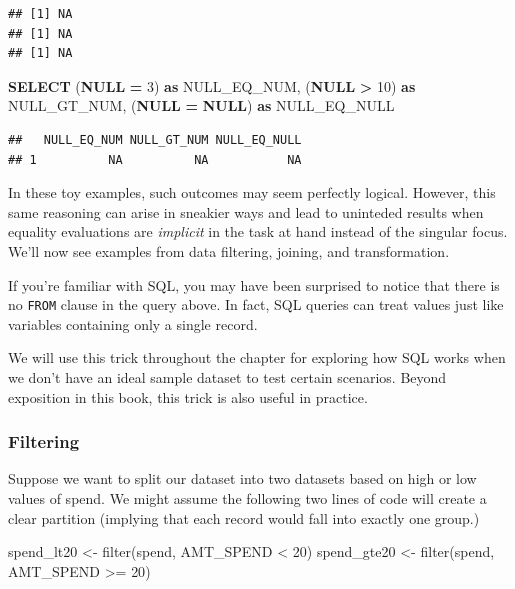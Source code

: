 \documentclass[
]{krantz}
\makeatletter
\newenvironment{Shaded}{\begin{snugshade}}{\end{snugshade}}
\newcommand{\DecValTok}[1]{\textcolor[rgb]{0.06,0.06,0.06}{#1}}
\newcommand{\FunctionTok}[1]{\textcolor[rgb]{0,0,0}{#1}}
\newcommand{\KeywordTok}[1]{\textcolor[rgb]{0.27,0.27,0.27}{\textbf{#1}}}
\newcommand{\NormalTok}[1]{#1}
\newcommand{\OperatorTok}[1]{\textcolor[rgb]{0.43,0.43,0.43}{\textbf{#1}}}
\newcommand{\OtherTok}[1]{\textcolor[rgb]{0.37,0.37,0.37}{#1}}
\newcommand{\SpecialCharTok}[1]{\textcolor[rgb]{0,0,0}{#1}}
\newenvironment{kframe}{%
\medskip{}
\setlength{\fboxsep}{.8em}
 \def\at@end@of@kframe{}%
 \ifinner\ifhmode%
  \def\at@end@of@kframe{\end{minipage}}%
  \begin{minipage}{\columnwidth}%
 \fi\fi%
 \def\FrameCommand##1{\hskip\@totalleftmargin \hskip-\fboxsep
 \colorbox{shadecolor}{##1}\hskip-\fboxsep
     \hskip-\linewidth \hskip-\@totalleftmargin \hskip\columnwidth}%
 \MakeFramed {\advance\hsize-\width
   \@totalleftmargin\z@ \linewidth\hsize
   \@setminipage}}%
 {\par\unskip\endMakeFramed%
 \at@end@of@kframe}
\renewenvironment{Shaded}{\begin{kframe}}{\end{kframe}}
\makeatother
\begin{document}
\begin{verbatim}
## [1] NA
## [1] NA
## [1] NA
\end{verbatim}

\begin{Shaded}
\begin{Highlighting}[]
\KeywordTok{SELECT}
\NormalTok{  (}\KeywordTok{NULL} \OperatorTok{=} \DecValTok{3}\NormalTok{) }\KeywordTok{as}\NormalTok{ NULL\_EQ\_NUM,}
\NormalTok{  (}\KeywordTok{NULL} \OperatorTok{\textgreater{}} \DecValTok{10}\NormalTok{) }\KeywordTok{as}\NormalTok{ NULL\_GT\_NUM,}
\NormalTok{  (}\KeywordTok{NULL} \OperatorTok{=} \KeywordTok{NULL}\NormalTok{) }\KeywordTok{as}\NormalTok{ NULL\_EQ\_NULL}
\end{Highlighting}
\end{Shaded}

\begin{verbatim}
##   NULL_EQ_NUM NULL_GT_NUM NULL_EQ_NULL
## 1          NA          NA           NA
\end{verbatim}

In these toy examples, such outcomes may seem perfectly logical.
However, this same reasoning can arise in sneakier ways and lead to uninteded results when equality evaluations are \emph{implicit} in the task at hand instead of the singular focus.
We'll now see examples from data filtering, joining, and transformation.

If you're familiar with SQL, you may have been surprised to notice that there is no \texttt{FROM} clause in the query above. In fact, SQL queries can treat values just like variables containing only a single record.

We will use this trick throughout the chapter for exploring how SQL works when we don't have an ideal sample dataset to test certain scenarios. Beyond exposition in this book, this trick is also useful in practice.

\hypertarget{filtering}{%
\subsubsection{Filtering}\label{filtering}}

Suppose we want to split our dataset into two datasets based on high or low values of spend.
We might assume the following two lines of code will create a clear partition (implying that each record would fall into exactly one group.)

\begin{Shaded}
\begin{Highlighting}[]
\NormalTok{spend\_lt20 }\OtherTok{\textless{}{-}} \FunctionTok{filter}\NormalTok{(spend, AMT\_SPEND }\SpecialCharTok{\textless{}} \DecValTok{20}\NormalTok{)}
\NormalTok{spend\_gte20 }\OtherTok{\textless{}{-}} \FunctionTok{filter}\NormalTok{(spend, AMT\_SPEND }\SpecialCharTok{\textgreater{}=} \DecValTok{20}\NormalTok{)}
\end{Highlighting}
\end{Shaded}
\end{document}
